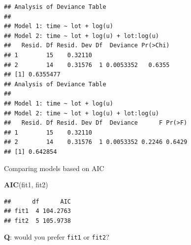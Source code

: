 \documentclass[
  ignorenonframetext,
]{beamer}
\newenvironment{Shaded}{\begin{snugshade}}{\end{snugshade}}
\newcommand{\AttributeTok}[1]{\textcolor[rgb]{0.13,0.29,0.53}{#1}}
\newcommand{\DecValTok}[1]{\textcolor[rgb]{0.00,0.00,0.81}{#1}}
\newcommand{\FunctionTok}[1]{\textcolor[rgb]{0.13,0.29,0.53}{\textbf{#1}}}
\newcommand{\NormalTok}[1]{#1}
\newcommand{\SpecialCharTok}[1]{\textcolor[rgb]{0.81,0.36,0.00}{\textbf{#1}}}
\newcommand{\StringTok}[1]{\textcolor[rgb]{0.31,0.60,0.02}{#1}}
\begin{document}
\begin{frame}[fragile]
\begin{Shaded}
\end{Shaded}

\begin{verbatim}
## Analysis of Deviance Table
## 
## Model 1: time ~ lot + log(u)
## Model 2: time ~ lot + log(u) + lot:log(u)
##   Resid. Df Resid. Dev Df  Deviance Pr(>Chi)
## 1        15    0.32110                      
## 2        14    0.31576  1 0.0053352   0.6355
## [1] 0.6355477
## Analysis of Deviance Table
## 
## Model 1: time ~ lot + log(u)
## Model 2: time ~ lot + log(u) + lot:log(u)
##   Resid. Df Resid. Dev Df  Deviance      F Pr(>F)
## 1        15    0.32110                           
## 2        14    0.31576  1 0.0053352 0.2246 0.6429
## [1] 0.642854
\end{verbatim}
\end{frame}

\begin{frame}[fragile]
\begin{block}{Comparing models based on AIC}
\protect\hypertarget{comparing-models-based-on-aic}{}
\begin{Shaded}
\begin{Highlighting}[]
\FunctionTok{AIC}\NormalTok{(fit1, fit2)}
\end{Highlighting}
\end{Shaded}

\begin{verbatim}
##      df      AIC
## fit1  4 104.2763
## fit2  5 105.9738
\end{verbatim}

\textbf{Q}: would you prefer \texttt{fit1} or \texttt{fit2}?
\end{block}
\end{frame}
\end{document}
